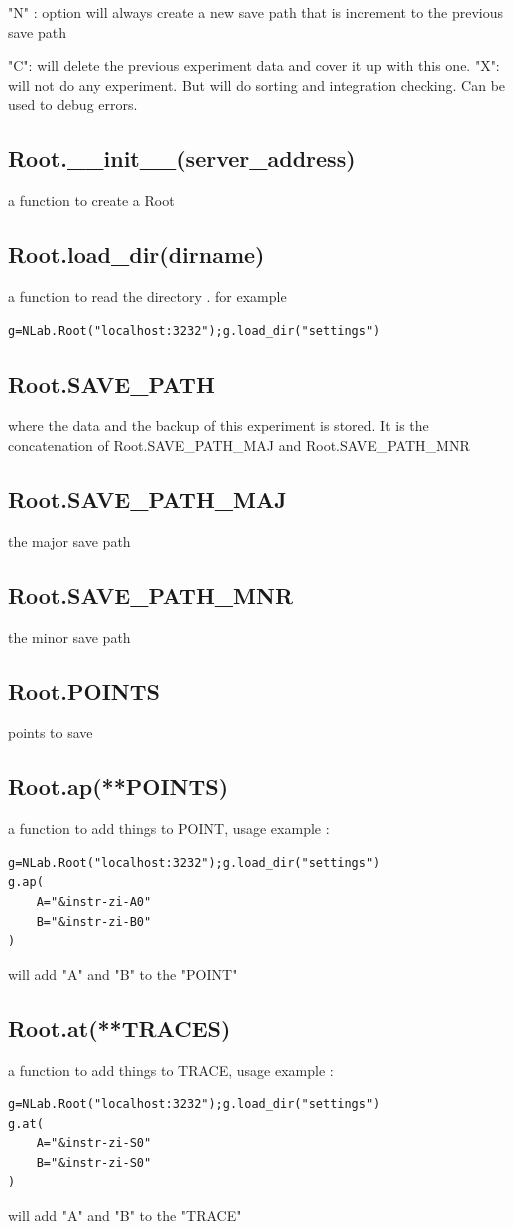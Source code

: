 \documentclass{article}
\begin{document}
 "N" : option will always create a new save path that is increment to the previous save path

"C": will delete the previous experiment data and cover it up with this one.
"X": will not do any experiment. But will do sorting and integration checking. Can be used to debug errors.

\subsection{Root.\_\_init\_\_(server\_address)}
a function to create a Root
\subsection{Root.load\_dir(dirname)}
a function to read the directory .
for example
\begin{lstlisting}
g=NLab.Root("localhost:3232");g.load_dir("settings")
\end{lstlisting}

\subsection{Root.SAVE\_PATH}
where the data and the backup of this experiment is stored.
It is the concatenation of Root.SAVE\_PATH\_MAJ
and Root.SAVE\_PATH\_MNR
\subsection{Root.SAVE\_PATH\_MAJ}
the major save path
\subsection{Root.SAVE\_PATH\_MNR}
the minor save path
\subsection{Root.POINTS}
points to save
\subsection{Root.ap(**POINTS)}
a function to add things to POINT, 
usage example :
\begin{lstlisting}
g=NLab.Root("localhost:3232");g.load_dir("settings")
g.ap(
	A="&instr-zi-A0"
	B="&instr-zi-B0"
)
\end{lstlisting}
will add "A" and "B" to the "POINT"

\subsection{Root.at(**TRACES)}
a function to add things to TRACE, 
usage example :
\begin{lstlisting}
g=NLab.Root("localhost:3232");g.load_dir("settings")
g.at(
	A="&instr-zi-S0"
	B="&instr-zi-S0"
)
\end{lstlisting}
will add "A" and "B" to the "TRACE"
\end{document}
